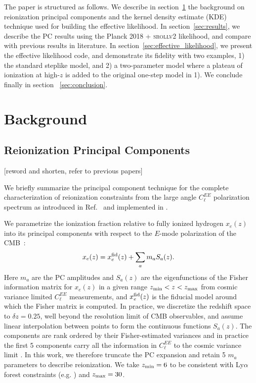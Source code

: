 \documentclass[prd,twocolumn,amsmath,amssymb,floatfix,superscriptaddress,nofootinbib]{revtex4-1}
\newcommand{\xef}{x_e^{\rm fid}}
\begin{document}
The paper is structured as follows. We describe in section~\ref{sec:background} the background on reionization principal components and the kernel density estimate (KDE) technique used for building the effective likelihood. In section~\ref{sec:results}, we describe the PC results using the Planck 2018 + \textsc{srollv2} likelihood, and compare with previous results in literature. In section~\ref{sec:effective_likelihood}, we present the effective likelihood code, and demonstrate its fidelity with two examples, 1) the standard steplike model, and 2) a two-parameter model where a plateau of ionization at high-$z$ is added to the original one-step model in 1). We conclude finally in section
~\ref{sec:conclusion}.



\section{Background}
\label{sec:background}

\subsection{Reionization Principal Components}

[reword and shorten, refer to previous papers]

We briefly summarize the principal component technique for the complete characterization
of reionization constraints from the large angle $C_\ell^{EE}$ polarization spectrum
as introduced in Ref.~\cite{Hu:2003gh} and implemented in \cite{Mortonson:2008rx,Mortonson:2007hq}.

We parametrize the ionization fraction relative to fully ionized hydrogen
$x_e(z)$ into its
principal components  with respect to the $E$-mode polarization of the 
CMB~\citep{Hu:2003gh}:
\begin{equation}
x_e(z)=\xef(z)+\sum_{a}m_{a}S_{a}(z).
\label{eq:mmutoxe}
\end{equation}
Here $m_a$ are the PC amplitudes and $S_{a}(z)$
are the eigenfunctions of the  Fisher information matrix for $x_e(z)$ in a given range  $z_{\rm min}<z<z_{\rm max}$ from cosmic variance limited $C_\ell^{EE}$ measurements,
and
$\xef(z)$ is the fiducial model around which the Fisher matrix is computed.  
In practice, we discretize the redshift space to $\delta z= 0.25$, well beyond the
resolution limit of CMB observables, and assume linear interpolation between points to form the
continuous functions $S_a(z)$.
The
components are rank ordered by their Fisher-estimated variances and  in practice
the first 5 components carry all the information in $C_\ell^{EE}$ to the cosmic variance limit
\cite{Hu:2003gh}.  In this work, we therefore truncate the PC expansion and retain 5 $m_a$
parameters to describe reionization.  We take $z_{\rm min}=6$ to be consistent with Ly$\alpha$
forest constraints (e.g. \cite{Becker:2015lua}) and $z_{\rm max}=30$.
\end{document}
